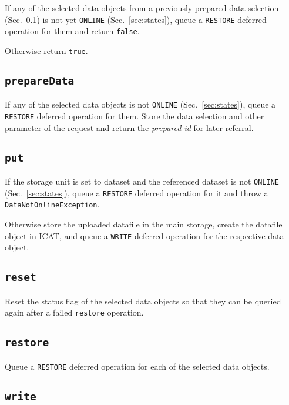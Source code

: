 \documentclass[paper=a4]{scrartcl}
\begin{document}
If any of the selected data objects from a previously prepared
data selection (Sec.\ \ref{sec:requests:prepareData}) is not yet
\texttt{ONLINE} (Sec.\ \ref{sec:states}), queue a \texttt{RESTORE}
deferred operation for them and return \texttt{false}.

Otherwise return \texttt{true}.

\subsection{\texttt{prepareData}}
\label{sec:requests:prepareData}

If any of the selected data objects is not \texttt{ONLINE}
(Sec.\ \ref{sec:states}), queue a \texttt{RESTORE} deferred operation
for them.  Store the data selection and other parameter of the request
and return the \emph{prepared id} for later referral.

\subsection{\texttt{put}}
\label{sec:requests:put}

If the storage unit is set to dataset and the referenced dataset is
not \texttt{ONLINE} (Sec.\ \ref{sec:states}), queue a \texttt{RESTORE}
deferred operation for it and throw a \texttt{DataNotOnlineException}.

Otherwise store the uploaded datafile in the main storage, create the
datafile object in ICAT, and queue a \texttt{WRITE} deferred operation
for the respective data object.

\subsection{\texttt{reset}}

Reset the status flag of the selected data objects so that they can
be queried again after a failed \texttt{restore} operation.

\subsection{\texttt{restore}}

Queue a \texttt{RESTORE} deferred operation for each of the selected
data objects.

\subsection{\texttt{write}}
\end{document}
